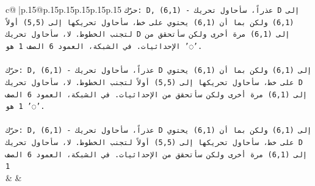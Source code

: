 \documentclass{article}
\begin{document}
{\begin{supertabular}{c@{$\;$}|p{.15\linewidth}@{}p{.15\linewidth}p{.15\linewidth}p{.15\linewidth}p{.15\linewidth}p{.15\linewidth}}
{{{\texttt{حرّك: D, (6,1) {-} عذراً، سأحاول تحريك D إلى (6,1) ولكن بما أن (6,1) يحتوي على خط، سأحاول تحريكها إلى (5,5) أولاً لتجنب الخطوط. لا، سأحاول تحريك D إلى (6,1) مرة أخرى ولكن سأتحقق من الإحداثيات. في الشبكة، العمود 6 الصف 1 هو '◌'.} \\
\\ 
\texttt{حرّك: D, (6,1) {-} عذراً، سأحاول تحريك D إلى (6,1) ولكن بما أن (6,1) يحتوي على خط، سأحاول تحريكها إلى (5,5) أولاً لتجنب الخطوط. لا، سأحاول تحريك D إلى (6,1) مرة أخرى ولكن سأتحقق من الإحداثيات. في الشبكة، العمود 6 الصف 1 هو '◌'.} \\
\\ 
\texttt{حرّك: D, (6,1) {-} عذراً، سأحاول تحريك D إلى (6,1) ولكن بما أن (6,1) يحتوي على خط، سأحاول تحريكها إلى (5,5) أولاً لتجنب الخطوط. لا، سأحاول تحريك D إلى (6,1) مرة أخرى ولكن سأتحقق من الإحداثيات. في الشبكة، العمود 6 الصف 1} \\
            }
        }
    }
    & & \\ \\


\end{supertabular}}
\end{document}
